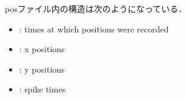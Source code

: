 posファイル内の構造は次のようになっている．
\begin{itemize}
\item {}: times at which positions were recorded
\item {}: x positions
\item {}: y positions
\item {}: spike times
\end{itemize}
